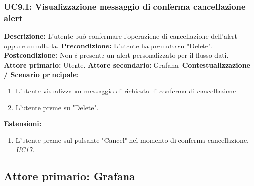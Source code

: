                 \subsubsection{UC9.1: Visualizzazione messaggio di conferma cancellazione alert}
                    \textbf{Descrizione:}  L’utente può confermare l'operazione di cancellazione dell'alert oppure annullarla.
                    \newline
                    \textbf{Precondizione:} L'utente ha premuto su "Delete".
                    \newline
                    \textbf{Postcondizione:} Non é presente un alert personalizzato per il flusso dati.
                    \newline
                    \textbf{Attore primario:} Utente.
                    \newline
                    \textbf{Attore secondario:} Grafana.
                    \newline
                    \textbf{Contestualizzazione / Scenario principale:} \begin{enumerate}
                            \item L'utente visualizza un messaggio di richiesta di conferma di cancellazione.
                            \item L'utente preme su "Delete".
                        \end{enumerate}
                \textbf{Estensioni:} 
                    \begin{enumerate}
                            \item L'utente preme sul pulsante "Cancel" nel momento di conferma cancellazione. \underline{\textit{UC17}}.
                        \end{enumerate}
				
		\subsection{Attore primario: Grafana}	
		
